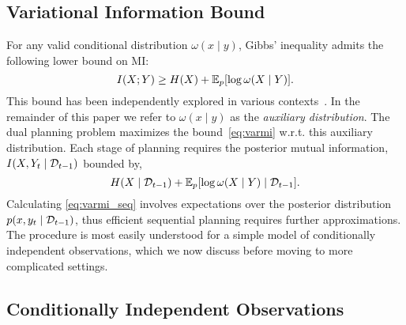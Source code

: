 \subsection{Variational Information Bound}
For any valid conditional distribution ${\omega(x\mid y)}$, Gibbs' inequality
admits the following lower bound on MI:
\begin{equation}\label{eq:varmi}
  I(X;Y) \geq H(X) + \mathbb{E}_p[ \log \omega(X\mid Y) ].
\end{equation}
This bound has been independently explored in various
contexts~\citep{agakov2004algorithm, mohamed2015variational,
  gao2016variational, chen2018learning}.  In the remainder of this
paper we refer to ${\omega(x\mid y)}$ as the \emph{auxiliary
  distribution}.  The dual planning problem maximizes the
bound~\eqref{eq:varmi} w.r.t. this auxiliary distribution.  Each stage
of planning requires the posterior mutual information, ${I(X,Y_t\mid
  \mathcal{D}_{t-1})}$ bounded by,
\begin{equation}
  H(X\mid \mathcal{D}_{t-1}) + \mathbb{E}_p[ \log \omega(X\mid Y) \mid
    \mathcal{D}_{t-1}].
  \label{eq:varmi_seq}
\end{equation}
Calculating \EQN\ref{eq:varmi_seq} involves expectations over the
posterior distribution ${p(x,y_t \mid \mathcal{D}_{t-1})}$, thus efficient
sequential planning requires further approximations.  The procedure is
most easily understood for a simple model of conditionally independent
observations, which we now discuss before moving to more complicated
settings.


\subsection{Conditionally Independent Observations}

